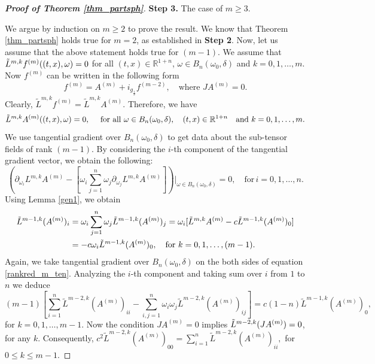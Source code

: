 \documentclass[11pt,a4paper,reqno]{amsart}
\begin{document}
\begin{proof}[\textbf{Proof of Theorem \ref{thm_partsph}}]
		\textbf{Step 3.} The case of $m\ge 3$.
		
        We argue by induction on \( m\geq 2 \) to prove the result. We know that Theorem \ref{thm_partsph} holds true for \( m = 2 \), as established in \textbf{Step 2}. Now, let us assume that the above statement holds true for $( m-1 )$. We assume that $\Tilde{L}^{m,k}f^{(m)}((t,x),\omega)=0$ for all $ (t,x) \in \mathbb{R}^{1+n}$, $ \omega \in B_{n}(\omega_0,\delta)$ and $k=0,1,\dots,m$. Now $f^{(m)}$ can be written in the following form
		\[
		f^{(m)}=A^{(m)}+i_{g_{\frac{1}{c}}}f^{(m-2)}, \quad \text{where }JA^{(m
			)}=0.
		\]
		Clearly, $\tilde{L}^{m,k}f^{(m)}=\tilde{L}^{m,k}A^{(m)}$. Therefore, we have 
		\[
		\Tilde{L}^{m,k}A^{(m)}((t,x),\omega)=0, \quad \text{ for all } \omega \in B_{n}(\omega_0,\delta),\quad (t,x) \in \mathbb{R}^{1+n} \quad \text{and } k=0,1,\dots,m.
		\]
		We use tangential gradient over $B_{n}(\omega_0,\delta) $ to get data about the sub-tensor fields of rank $(m-1)$. By considering the \( i \)-th component of the tangential gradient vector, we  obtain the following:
		\[
	\left(	\partial_{\omega_i}L^{m,k}A^{(m)} -[\omega_i \sum_{j=1}^{n}\omega_{j}\partial_{\omega_j}L^{m,k}A^{(m)}]\right)\Big|_{\omega \in B_{n}(\omega_0,\delta) }=0, \quad  \text{for} \, i=0,1,\dots,n.
		\]
		Using Lemma \ref{gen1}, we obtain
		\begin{equation}\label{rankred_m_ten}
			\begin{aligned}
				\Tilde{L}^{m-1,k}(A^{(m)})_i&= \omega_i \sum_{j=1}^{n}\omega_j \Tilde{L}^{m-1,k}(A^{(m)})_j
				=\omega_i [\Tilde{L}^{m,k}A^{(m)}-c \Tilde{L}^{m-1,k}(A^{(m)})_0]\\
				&= -c\omega_i \Tilde{L}^{m-1,k}(A^{(m)})_0, \quad \text{for } k=0,1,\dots, (m-1).
			\end{aligned}
		\end{equation}
		Again, we take tangential gradient over $B_{n}(\omega_0,\delta)$ on the both sides of equation \eqref{rankred_m_ten}. Analyzing the $i$-th component and taking sum over $i$ from $1$ to $n$ we deduce
		\begin{equation}\label{relation2}
			(m-1)\left[\sum_{i=1}^{n}\tilde{L}^{m-2,k}
			(A^{(m)})_{ii}-\sum_{i,j=1}^{n}\omega_i \omega_j\tilde{L}^{m-2,k}(A^{(m)})_{ij}\right]
			=c(1-n)\tilde{L}^{m-1,k}(A^{(m)})_0,
		\end{equation}
		for $k=0,1,\dots,m-1$.
		Now the condition $JA^{(m
			)}=0$ implies \( \Tilde{L}^{m-2,k}(JA^{(m
			)}) = 0 \), for any \( k \).
	Consequently,  $	c^2 \tilde{L}^{m-2,k}(A^{(m)})_{00}=\sum_{i=1}^{n} \tilde{L}^{m-2,k}(A^{(m)})_{ii}, $ for $0\le k \le m-1$.

\end{proof}
\end{document}
